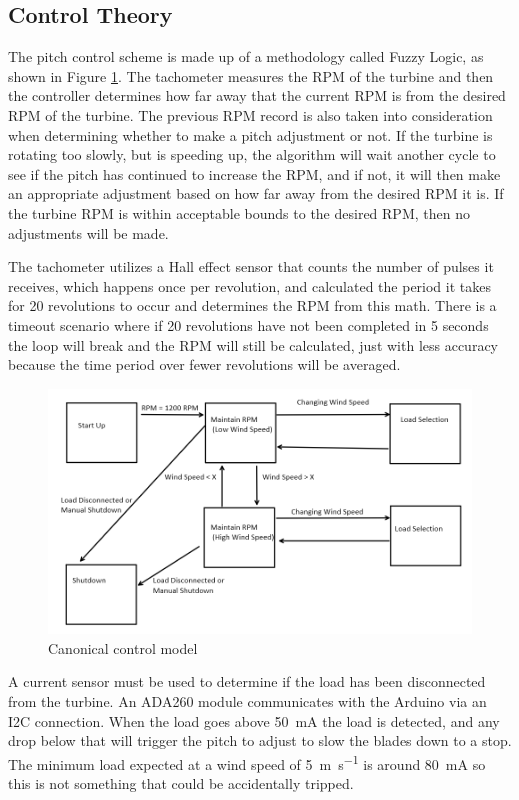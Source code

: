 \documentclass[../ewet_cwc_report.tex]{subfiles}
\begin{document}
\subsection{Control Theory}
The pitch control scheme is made up of a methodology called
Fuzzy Logic, as shown in Figure \ref{img:control}. The
tachometer measures the RPM of the turbine
and then the controller determines how far away that the
current RPM is from the desired RPM of the turbine. The
previous RPM record is also taken into consideration when
determining whether to make a pitch adjustment or not. If the
turbine is rotating too slowly, but is speeding up, the
algorithm will wait another cycle to see if the pitch has
continued to increase the RPM, and if not, it will then make
an appropriate adjustment based on how far away from the
desired RPM it is. If the turbine RPM is within acceptable
bounds to the desired RPM, then no adjustments will be made.

The tachometer utilizes a Hall effect sensor that counts the
number of pulses it receives, which happens once per
revolution, and calculated the period it takes for 20
revolutions to occur and determines the RPM from this math.
There is a timeout scenario where if 20 revolutions have not
been completed in 5 seconds the loop will break and the RPM
will still be calculated, just with less accuracy because the
time period over fewer revolutions will be averaged.

\onecolumn
\begin{figure}[th]
  \centering
  \includegraphics[width=\textwidth]{../_images/control.png}
  \caption{Canonical control model}
  \label{img:control}
\end{figure}
\twocolumn

A current sensor must be used to determine if the load has
been disconnected from the turbine. An ADA260 module
communicates with the Arduino via an I2C connection. When the
load goes above \qty{50}{\mA} the load is detected, and any
drop below that will trigger the pitch to adjust to slow the
blades down to a stop. The minimum load expected at a wind
speed of \qty{5}{\m\per\s} is around \qty{80}{\mA} so this is
not something that could be accidentally tripped.
\end{document}
